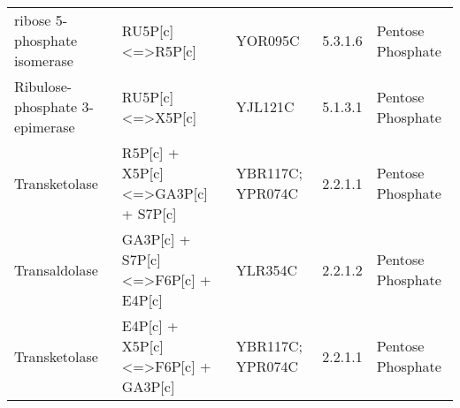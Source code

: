 \begin{table}[H]
\begin{center}
{\begin{tabular}{p{11cm}p{17cm}p{8cm}lp{5cm}}
ribose 5-phosphate isomerase                                                              & RU5P{[}c{]} \textless{}=\textgreater R5P{[}c{]}                                                                                                 & YOR095C                                                                                                                                                          & 5.3.1.6            & Pentose Phosphate                                                           \\
Ribulose-phosphate 3-epimerase                                                            & RU5P{[}c{]} \textless{}=\textgreater X5P{[}c{]}                                                                                                 & YJL121C                                                                                                                                                          & 5.1.3.1            & Pentose Phosphate                                                           \\
Transketolase                                                                             & R5P{[}c{]} + X5P{[}c{]} \textless{}=\textgreater GA3P{[}c{]} + S7P{[}c{]}                                                                       & YBR117C; YPR074C                                                                                                                                                 & 2.2.1.1            & Pentose Phosphate                                                           \\
Transaldolase                                                                             & GA3P{[}c{]} + S7P{[}c{]} \textless{}=\textgreater F6P{[}c{]} + E4P{[}c{]}                                                                       & YLR354C                                                                                                                                                          & 2.2.1.2            & Pentose Phosphate                                                           \\
Transketolase                                                                             & E4P{[}c{]} + X5P{[}c{]} \textless{}=\textgreater F6P{[}c{]} + GA3P{[}c{]}                                                                       & YBR117C; YPR074C                                                                                                                                                 & 2.2.1.1            & Pentose Phosphate                                                           \\

\end{tabular}}
\end{center}
\end{table}
